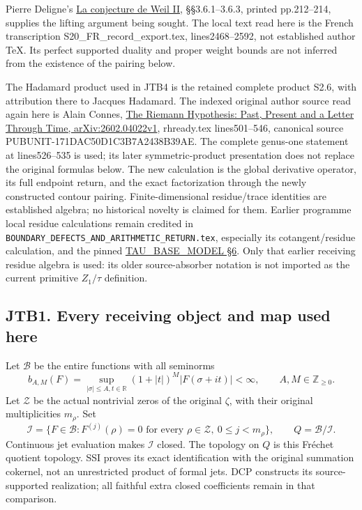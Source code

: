 Pierre Deligne's
\href{https://www.numdam.org/item/PMIHES_1980__52__137_0/}{La conjecture
de Weil II}, §§3.6.1--3.6.3, printed pp.212--214, supplies the lifting
argument being sought. The local text read here is the French
transcription S20\_FR\_record\_export.tex, lines2468--2592, not
established author TeX. Its perfect supported duality and proper weight
bounds are not inferred from the existence of the pairing below.

The Hadamard product used in JTB4 is the retained complete product S2.6,
with attribution there to Jacques Hadamard. The indexed original author
source read again here is Alain Connes,
\href{https://arxiv.org/abs/2602.04022v1}{The Riemann Hypothesis: Past,
Present and a Letter Through Time, arXiv:2602.04022v1}, rhready.tex
lines501--546, canonical source PUBUNIT-171DAC50D1C3B7A2438B39AE. The
complete genus-one statement at lines526--535 is used; its later
symmetric-product presentation does not replace the original formulas
below. The new calculation is the global derivative operator, its full
endpoint return, and the exact factorization through the newly
constructed contour pairing. Finite-dimensional residue/trace identities
are established algebra; no historical novelty is claimed for them.
Earlier programme local residue calculations remain credited in
\nolinkurl{BOUNDARY_DEFECTS_AND_ARITHMETIC_RETURN.tex}, especially its
cotangent/residue calculation, and the pinned
\href{https://github.com/KokunoYumeto/zeta-function-research-reader/blob/4ba9285b66af58a6d58fc502a494c1fb45ca5b79/workbenches/tau-base-cohomology/TAU_BASE_MODEL.md\#L265-L322}{TAU\_BASE\_MODEL
§6}. Only that earlier receiving residue algebra is used: its older
source-absorber notation is not imported as the current primitive
\(Z_1/\tau\) definition.

\subsection{JTB1. Every receiving object and map used
here}\label{jtb1.-every-receiving-object-and-map-used-here}

Let \(\mathcal B\) be the entire functions with all seminorms \[
b_{A,M}(F)=\sup_{|\sigma|\le A,t\in\mathbb R}
(1+|t|)^M|F(\sigma+it)|<\infty,
\qquad A,M\in\mathbb Z_{\ge0}.
\tag{JTB1.1}
\] Let \(\mathscr Z\) be the actual nontrivial zeros of the original
\(\zeta\), with their original multiplicities \(m_\rho\). Set \[
\mathcal I=\{F\in\mathcal B:F^{(j)}(\rho)=0
\text{ for every }\rho\in\mathscr Z,\ 0\le j<m_\rho\},
\qquad Q=\mathcal B/\mathcal I.
\tag{JTB1.2}
\] Continuous jet evaluation makes \(\mathcal I\) closed. The topology
on \(Q\) is this Fréchet quotient topology. SSI proves its exact
identification with the original summation cokernel, not an unrestricted
product of formal jets. DCP constructs its source-supported realization;
all faithful extra closed coefficients remain in that comparison.

